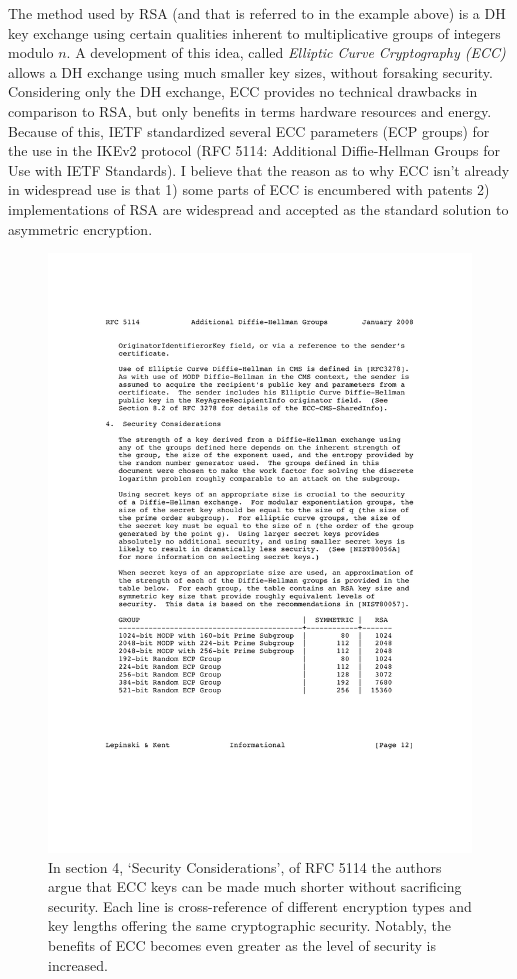 \documentclass[final,a4paper,twoside,11pt,onecolumn]{report}
\begin{document}
The method used by RSA (and that is referred to in the example above) is a DH key exchange using certain qualities inherent to multiplicative groups of integers modulo $n$. A development of this idea, called \emph{Elliptic Curve Cryptography (ECC)} allows a DH exchange using much smaller key sizes, without forsaking security. Considering only the DH exchange, ECC provides no technical drawbacks in comparison to RSA, but only benefits in terms hardware resources and energy. Because of this, IETF standardized several ECC parameters (ECP groups) for the use in the IKEv2 protocol (RFC 5114: Additional Diffie-Hellman Groups for Use with IETF Standards\cite{rfc5114}). I believe that the reason as to why ECC isn't already in widespread use is that 1) some parts of ECC is encumbered with patents 2) implementations of RSA are widespread and accepted as the standard solution to asymmetric encryption.

\begin{figure}[h!]
   \includegraphics[width=1.0\textwidth]{rfc5114-security}
   \caption{In section 4, `Security Considerations', of RFC 5114\cite{rfc5114} the authors argue that ECC keys can be made much shorter without sacrificing security. Each line is cross-reference of different encryption types and key lengths offering the same cryptographic security. Notably, the benefits of ECC becomes even greater as the level of security is increased.}
   \label{fig:eccbenefits}
\end{figure}
\end{document}
